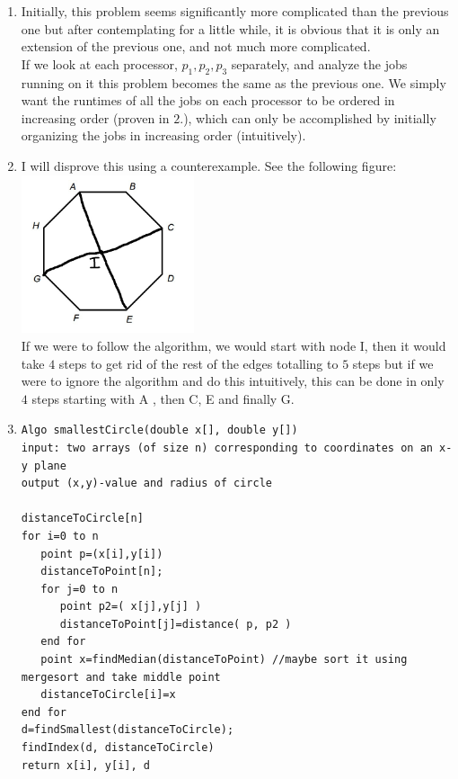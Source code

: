 \begin{enumerate}[1.]
\item
Initially, this problem seems significantly more complicated than the previous one but after contemplating for a little while, it is obvious that it is only an extension of the previous one, and not much more complicated. \\ 
If we look at each processor, $p_1, p_2, p_3$ separately, and analyze the jobs running on it this problem becomes the same as the previous one. We simply want the runtimes of all the jobs on each processor to be ordered in increasing order (proven in $2.$), which can only be accomplished by initially organizing the jobs in increasing order (intuitively). 

\item
I will disprove this using a counterexample. See the following figure:\\
\includegraphics[width=0.4\textwidth]{graph.jpg}\\
If we were to follow the algorithm, we would start with node I, then it would take $4$ steps to get rid of the rest of the edges totalling to $5$ steps but if we were to ignore the algorithm and do this intuitively, this can be done in only $4$ steps starting with A , then C, E and finally G. 


\item
\begin{verbatim}
Algo smallestCircle(double x[], double y[])
input: two arrays (of size n) corresponding to coordinates on an x-y plane
output (x,y)-value and radius of circle

distanceToCircle[n]
for i=0 to n
   point p=(x[i],y[i])
   distanceToPoint[n];
   for j=0 to n
      point p2=( x[j],y[j] )
      distanceToPoint[j]=distance( p, p2 )
   end for
   point x=findMedian(distanceToPoint) //maybe sort it using mergesort and take middle point
   distanceToCircle[i]=x
end for
d=findSmallest(distanceToCircle);
findIndex(d, distanceToCircle)
return x[i], y[i], d
\end{verbatim}


\end{enumerate}
